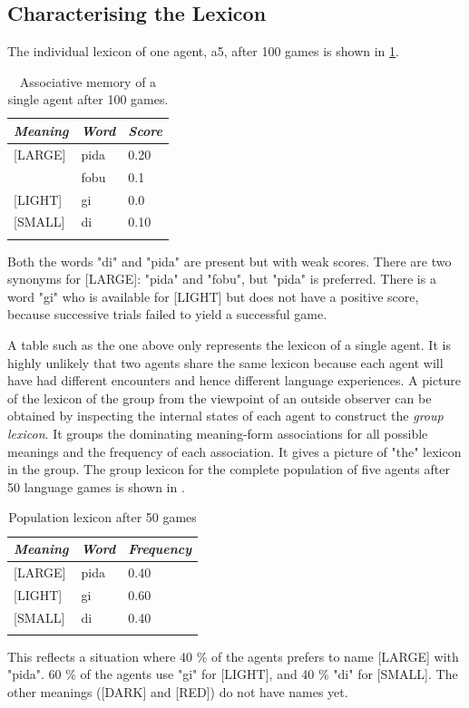 \subsection{Characterising the Lexicon}

The individual lexicon of one
agent, {\bfshape a5}, after 100 games is shown in \ref{tab:t-mem3}. 
\begin{table}
\begin{center}
\begin{tabular}{l  l  l }
\lsptoprule 
{\itshape Meaning} & {\itshape Word} & {\itshape Score} \\ \midrule
{}[LARGE]& pida& 0.20\\ 
  & fobu& 0.1\\ 
{}[LIGHT]& gi& 0.0\\ 
{}[SMALL]& di & 0.10\\ 
\lspbottomrule
\end{tabular}
\caption{\label{tab:t-mem3} Associative memory of a single agent after 100 games.}
\end{center}
\end{table}
Both the words "di" and "pida" are present but with 
weak scores. There are two synonyms for 
{}[LARGE]: "pida" and "fobu", but "pida" is 
preferred. There is a word "gi" who is available 
for [LIGHT] but does not have a positive score,
because successive trials failed to yield a successful game. 

A table such as the one above only represents the lexicon
of a single agent. It is highly unlikely that two agents
share the same lexicon because each agent will have 
had different encounters and hence different language
experiences. A picture of the lexicon of the group from the 
viewpoint of an outside observer can be obtained by
inspecting the internal states of each agent to 
construct the {\itshape group lexicon}. It groups the 
dominating meaning-form associations for all possible
meanings and the frequency of each association. 
It gives a picture of "the" lexicon 
in the group. The group lexicon
for the complete population of five agents after 50 language games
is shown in . 
\begin{table}
\begin{center}
\begin{tabular}{l  l  l }
\lsptoprule 
{\itshape Meaning}& {\itshape Word} & {\itshape Frequency} \\ \midrule 
{}[LARGE]& pida& 0.40\\ 
{}[LIGHT]& gi & 0.60\\ 
{}[SMALL]& di & 0.40\\ 
\lspbottomrule
\end{tabular}
\caption{\label{tab:t-mem4} Population lexicon after 50 games}
\end{center}
\end{table}
This reflects a situation where 40 \%
of the agents prefers to name [LARGE] with
"pida". 60 \% of the agents
use "gi" for [LIGHT], and 40 \% "di" for [SMALL]. 
The other meanings ([DARK] and [RED]) do not have names yet. 

